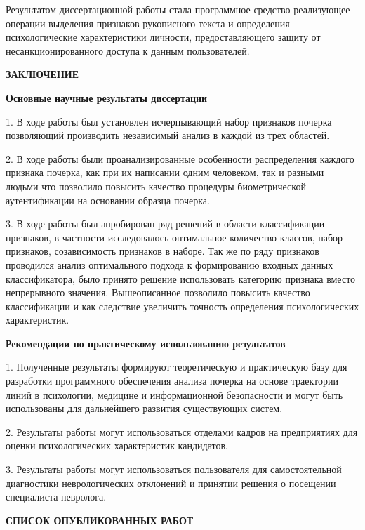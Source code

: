 Результатом диссертационной работы стала программное средство реализующее операции выделения признаков рукописного текста и определения психологические характеристики личности, предоставляющего защиту от несанкционированного доступа к данным пользователей.

\clearpage

\begin{center}
{\bfseries ЗАКЛЮЧЕНИЕ}
\end{center}

\textbf{Основные научные результаты диссертации}
\bigskip

1. В ходе работы был установлен исчерпывающий набор признаков почерка позволяющий производить независимый анализ в каждой из трех областей.

2. В ходе работы были проанализированные особенности распределения каждого признака почерка, как при их написании одним человеком, так и разными людьми что позволило повысить качество процедуры биометрической аутентификации на основании образца почерка.

3. В ходе работы был апробирован ряд решений в области классификации признаков, в частности исследовалось оптимальное количество классов, набор признаков, созависимость признаков в наборе. Так же по ряду признаков проводился анализ оптимального подхода к формированию входных данных классификатора, было принято решение использовать категорию признака вместо непрерывного значения. Вышеописанное позволило повысить качество классификации и как следствие увеличить точность определения психологических характеристик.

\bigskip
\textbf{Рекомендации по практическому использованию результатов}
\bigskip

1. Полученные результаты формируют теоретическую и практическую базу для разработки программного обеспечения анализа почерка на основе траектории линий в психологии, медицине и информационной безопасности и могут быть использованы для дальнейшего развития существующих систем.

2. Результаты работы могут использоваться отделами кадров на предприятиях для оценки психологических характеристик кандидатов.

3. Результаты работы могут использоваться пользователя для самостоятельной диагностики неврологических отклонений и принятии решения о посещении специалиста невролога.

\clearpage

\begin{center}
{\bfseries СПИСОК ОПУБЛИКОВАННЫХ РАБОТ}
\end{center}

